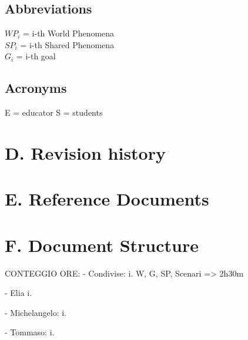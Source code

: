 \subsection{Abbreviations}
\(WP_i\) = i-th World Phenomena\\
\(SP_i\) = i-th Shared Phenomena\\
\(G_i\) = i-th goal
\subsection{Acronyms}
E = educator
S = students
\section{D. Revision history}
\section{E. Reference Documents}
\section{F. Document Structure}

CONTEGGIO ORE:
- Condivise:
i. W, G, SP, Scenari => 2h30m

- Elia
i.

- Michelangelo:
i.

- Tommaso:
i.
